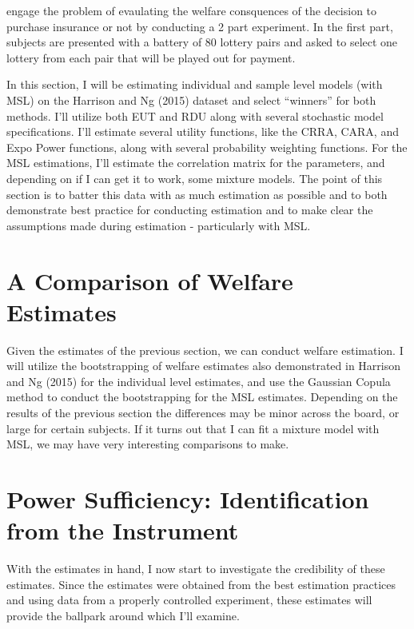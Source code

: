 \documentclass[../main.tex]{subfiles}
\begin{document}
\textcite{Harrison2015} engage the problem of evaulating the welfare consquences of the decision to purchase insurance or not by conducting a 2 part experiment.
In the first part, subjects are presented with a battery of 80 lottery pairs and asked to select one lottery from each pair that will be played out for payment.





In this section, I will be estimating individual and sample level models (with MSL) on the Harrison and Ng (2015) dataset and select \enquote{winners} for both methods.
I'll utilize both EUT and RDU along with several stochastic model specifications.
I'll estimate several utility functions, like the CRRA, CARA, and Expo Power functions, along with several probability weighting functions.
For the MSL estimations, I'll estimate the correlation matrix for the parameters, and depending on if I can get it to work, some mixture models.
The point of this section is to batter this data with as much estimation as possible and to both demonstrate best practice for conducting estimation and to make clear the assumptions made during estimation - particularly with MSL.

\section{A Comparison of Welfare Estimates}

Given the estimates of the previous section, we can conduct welfare estimation.
I will utilize the bootstrapping of welfare estimates also demonstrated in Harrison and Ng (2015) for the individual level estimates, and use the Gaussian Copula method to conduct the bootstrapping for the MSL estimates.
Depending on the results of the previous section the differences may be minor across the board, or large for certain subjects.
If it turns out that I can fit a mixture model with MSL, we may have very interesting comparisons to make.

\section{Power Sufficiency: Identification from the Instrument}

With the estimates in hand, I now start to investigate the credibility of these estimates.
Since the estimates were obtained from the best estimation practices and using data from a  properly controlled experiment, these estimates will provide the ballpark around which I'll examine.
\end{document}
